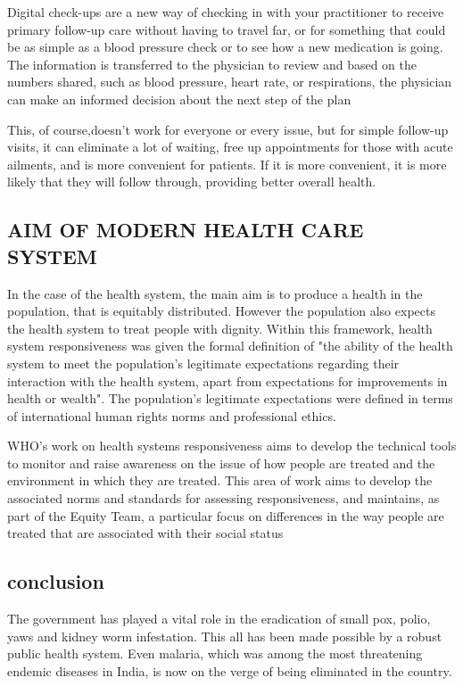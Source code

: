 \documentclass{article}
\begin{document}
Digital check-ups are a new way of checking in with your practitioner to receive
primary follow-up care without having to travel far, or for something that could
be as simple as a blood pressure check or to see how a new medication is going.
The information is transferred to the physician to review and based on the
numbers shared, such as blood pressure, heart rate, or respirations, the physician
can make an informed decision about the next step of the plan




This, of course,doesn’t work for everyone or every issue, but for simple follow-up visits, it can
eliminate a lot of waiting, free up appointments for those with acute ailments,
and is more convenient for patients. If it is more convenient, it is more likely
that they will follow through, providing better overall health.

\clearpage

\subsection{AIM OF MODERN HEALTH CARE SYSTEM}

In the case of the health system, the main aim is to produce a health in the population, that is equitably distributed. However the population also expects the health system to treat people with dignity. Within this framework, health system responsiveness was given the formal definition of "the ability of the health system to meet the population's legitimate expectations regarding their interaction with the health system, apart from expectations for improvements in health or wealth". The population's legitimate expectations were defined in terms of international human rights norms and professional ethics.


WHO's work on health systems responsiveness aims to develop the technical tools to monitor and raise awareness on the issue of how people are treated and the environment in which they are treated. This area of work aims to develop the associated norms and standards for assessing responsiveness, and maintains, as part of the Equity Team, a particular focus on differences in the way people are treated that are associated with their social status


\subsection{conclusion}

The government has played a vital role in the eradication of small pox, polio,
yaws and kidney worm infestation. This all has been made possible by a robust
public health system. Even malaria, which was among the most threatening
endemic diseases in India, is now on the verge of being eliminated in the country.
\end{document}
